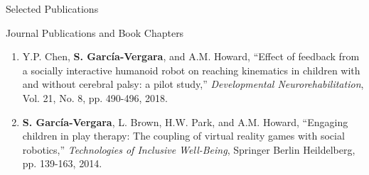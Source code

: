 \documentclass{resume} %
\newcommand{\sectionspace}{\vspace{3mm}}
\newcommand{\Sergio}{\textbf{S. Garc\'{i}a-Vergara}}
\newcommand{\SuperPop}{Super Pop VR\textsuperscript{TM}\space}
\newcommand{\fixme}{\textcolor{red}{\textbf{fix me}} \space}
\newcommand{\attention}[1]{\noindent \fixme \textcolor{red}{#1}}
\begin{document}

\sectionspace
\begin{rSection}{Selected Publications}

\iffalse
\begin{rSubsection}{In Preparation}{}{}{}
\item
\begin{enumerate}

\item \Sergio, Y.P. Chen, and A.M. Howard, ``Instance- versus Individual-based
  Upper-body Movement Classification for Ground Truth Movement Baseline
  Selection,'' \attention{where to publish?}

\item \Sergio, Y.P. Chen, and A.M. Howard, ``Algorithms for computing
  upper-extremity reaching kinematics,'' \textit{IEEE Transactions on Neural
    Systems and Rehabilitation Engineering}, 2017.

\end{enumerate}
\end{rSubsection}
\fi



\sectionspace
\begin{rSubsection}{Journal Publications and Book Chapters}{}{}{}
\item
\begin{enumerate}

\item Y.P. Chen, \Sergio, and A.M. Howard, ``Effect of feedback from a socially
  interactive humanoid robot on reaching kinematics in children with and without
  cerebral palsy: a pilot study,'' \textit{Developmental Neurorehabilitation},
  Vol. 21, No. 8, pp. 490-496, 2018.

\iffalse
\item Y.P. Chen, \Sergio, and A.M. Howard, ``Effect of a Home-Based Virtual
  Reality Intervention for Children with Cerebral Palsy using \SuperPop
  Evaluation Metrics: A Feasibility Study,'' \textit{Rehabilitation Research and
    Practice}, 2015.
\fi

\item \Sergio, L. Brown, H.W. Park, and A.M. Howard, ``Engaging children in play
  therapy: The coupling of virtual reality games with social robotics,''
  \textit{Technologies of Inclusive Well-Being}, Springer Berlin Heildelberg,
  pp. 139-163, 2014.
\end{enumerate}
\end{rSubsection}




\end{rSection}
\end{document}
